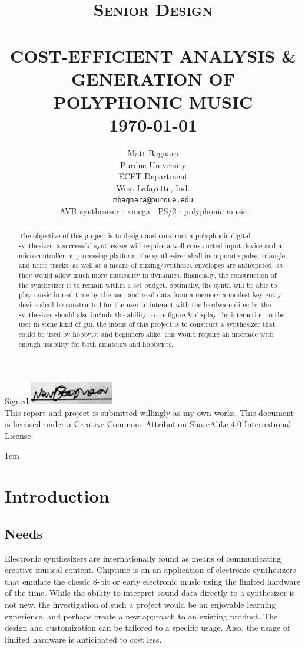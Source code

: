 \documentclass[bibtotocnumbered,abstract=on,paper=a4,fontsize=12pt,parskip=on,halfparskip=on]{scrartcl}		%
\title{	\normalsize \textsc{Senior Design} 	%
		 	\\[2.0cm]													%
			\HRule{0.5pt} \\										%
			\LARGE \textbf{\uppercase{Cost-Efficient Analysis \& Generation of Polyphonic Music}}	%
			\HRule{2pt} \\ [0.5cm]								%
			\normalsize \today									%
		}
\author{
		Matt Bagnara\\	
		Purdue University\\	
		ECET Department\\
    West Lafayette, Ind.\\
    \texttt{mbagnara@purdue.edu} \\ 
    \vskip 1cm 
    \scriptsize{AVR synthesizer $\cdot$ xmega $\cdot$ PS/2 $\cdot$ polyphonic music}\\
}
\makeatletter
\def\printtitle{%
    {\centering \@title\par}}
\def\printauthor{%
    {\centering \large \@author}}
\makeatother
\begin{document}
\begin{titlepage}
\thispagestyle{empty}				%

\printtitle									%
  	\vfill
\printauthor								%
    \vfill
    Signed:\includegraphics[height=1cm]{img/signature.png}\\
This report and project is submitted willingly as my own works. This document is licensed under a Creative  Commons Attribution-ShareAlike 4.0 International License.
\end{titlepage}
\newpage
\begin{abstract}
The objective of this project is to design and construct a polyphonic digital synthesizer. a successful synthesizer will require a well-constructed input device and a microcontroller or processing platform. the synthesizer shall incorporate pulse, triangle, and noise tracks, as well as a means of mixing/synthesis. envelopes are anticipated, as they would allow much more musicality in dynamics. financially, the construction of the synthesizer is to remain within a set budget. optimally, the synth will be able to play music in real-time by the user and read data from a memory a modest key entry device shall be constructed for the user to interact with the hardware directly. the synthesizer should also include the ability to configure \& display the interaction to the user in some kind of gui. the intent of this project is to construct a synthesizer that could be used by hobbyist and beginners alike. this would require an interface with enough usability for both amateurs and hobbyists.
\end{abstract}
\newpage
\begin{tableofcontents}
\end{tableofcontents}
\newpage
  \parskip1em

\section{Introduction}
  \subsection{Needs}
Electronic synthesizers are internationally found as means of communicating creative musical content. Chiptune is an an application of electronic synthesizers that emulate the classic 8-bit or early electronic music using the limited hardware of the time. While the ability to interpret sound data directly to a synthesizer is not new, the investigation of such a project would be an enjoyable learning experience, and perhaps create a new approach to an existing product. The design and customization can be tailored to a specific usage. Also, the usage of limited hardware is anticipated to cost less.
\end{document}
